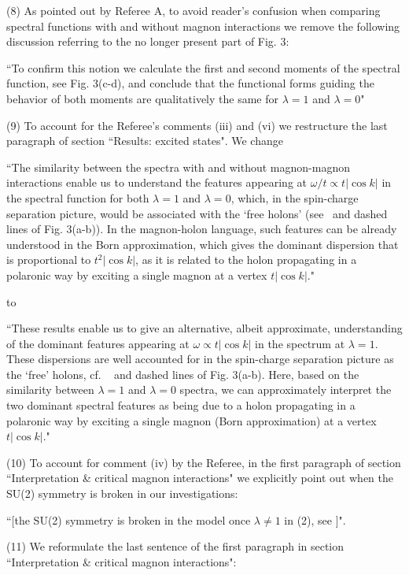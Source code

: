 \documentclass[%
 manuscript,
 amsmath,amssymb,
 aps, onecolumn,
prl,
]{revtex4-1}
\begin{document}
(8) As pointed out by Referee A, to avoid reader's confusion when comparing spectral functions with and without magnon interactions we remove the following discussion referring to the no longer present part of Fig. 3:

``To confirm this notion we calculate the first and second moments of the spectral function, see Fig. 3(c-d), and conclude that the functional forms guiding the behavior of both moments are qualitatively the same for $\lambda= 1$ and $\lambda =0$"

(9) To account for the Referee's comments (iii) and (vi) we restructure the last paragraph of section ``Results: excited states". We change

``The similarity between the spectra with and without magnon-magnon interactions enable us to understand the features appearing at $\omega / t \propto t |\cos k | $ in the spectral function for both $\lambda =1 $ and $\lambda = 0$, which, in the spin-charge separation picture, would be associated with the `free holons' (see~ and dashed lines of Fig. 3(a-b)). In the magnon-holon language, such features can be already understood in the Born approximation, which gives the dominant dispersion that is proportional to $t^2 |\cos k|$, as it is related to the holon propagating in a polaronic way by exciting a single magnon at a vertex $t |\cos k | $."

to

``These results enable us to give an alternative, albeit approximate, understanding of the dominant features appearing at $\omega \propto t |\cos k |$ in the spectrum at $\lambda=1$. These dispersions are well accounted for in the spin-charge separation picture as the `free' holons, cf. ~\cite{Ede97, Kim97} and dashed lines of Fig. 3(a-b). Here, based on the similarity between $\lambda =1 $ and $\lambda = 0$ spectra, we can approximately interpret the two dominant spectral features as being due to a holon propagating in a polaronic way by exciting a single magnon (Born approximation) at a vertex $t |\cos k | $."

(10) To account for comment (iv) by the Referee, in the first paragraph of section ``Interpretation \& critical magnon interactions" we explicitly point out when the SU(2) symmetry is broken in our investigations:

``[the SU(2) symmetry is broken in the model once $\lambda \neq 1$ in (2), see \cite{SM}]".

(11) We reformulate the last sentence of the first paragraph in section ``Interpretation \& critical magnon interactions":
\end{document}
